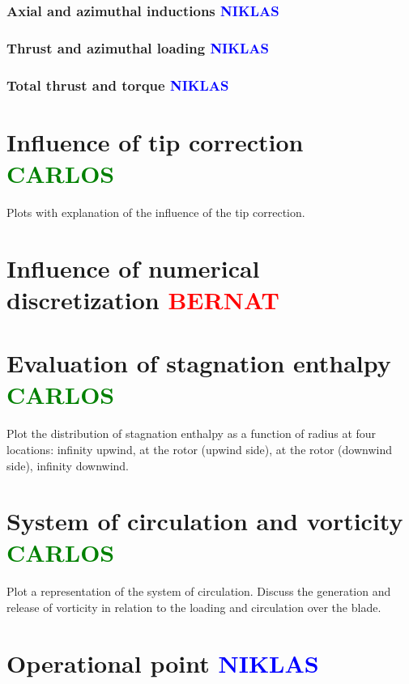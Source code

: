 \subsubsection{Axial and azimuthal inductions \textcolor{blue}{NIKLAS}}

\subsubsection{Thrust and azimuthal loading \textcolor{blue}{NIKLAS}}

\subsubsection{Total thrust and torque \textcolor{blue}{NIKLAS}}

\section{Influence of tip correction \textcolor{green}{CARLOS}}

Plots with explanation of the influence of the tip correction.

\section{Influence of numerical discretization \textcolor{red}{BERNAT}}

\section{Evaluation of stagnation enthalpy \textcolor{green}{CARLOS}}

Plot the distribution of stagnation enthalpy as a function of radius at four locations: infinity upwind, at the rotor (upwind side), at the rotor (downwind side), infinity downwind.

\section{System of circulation and vorticity \textcolor{green}{CARLOS}}

Plot a representation of the system of circulation. Discuss the generation and release of vorticity in relation to the loading and circulation over the blade.

\section{Operational point \textcolor{blue}{NIKLAS}}
